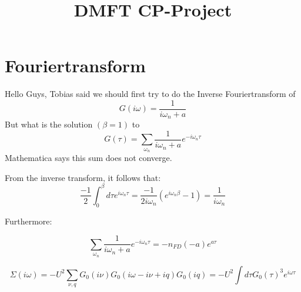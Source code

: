 \documentclass[a4paper]{article}
\title{DMFT CP-Project}
\begin{document}
\maketitle

\section{Fouriertransform}
Hello Guys, Tobias said we should first try to do the Inverse Fouriertransform of
\begin{equation}
G(i ω)= \frac{1}{i ω_n + a}
\end{equation}
But what is the solution $(β=1)$ to
\begin{equation}
G(τ)= \sum_{ω_n}\frac{1}{i ω_n + a} e^{-i ω_n τ}
\end{equation}
Mathematica says this sum does not converge. 


From the inverse transform, it follows that:
\begin{equation}
\frac{-1}{2} \int_0^{\beta} d\tau e^{i\omega_n \tau} = \frac{-1}{2i\omega_n} ( e^{i\omega_n \beta} - 1) = \frac{1}{i\omega_n}
\end{equation}

Furthermore:

\begin{equation}
\sum_{\omega_n} \frac{1}{i\omega_n + a} e^{-i\omega_n \tau} = - n_{FD} (-a) e^{a \tau} 
\end{equation}


\begin{equation}
\Sigma(i\omega) = - U^2 \sum_{\nu, q} G_0(i\nu) G_0(i\omega-i\nu+iq) G_0(iq) = -U^2 \int d\tau G_0(\tau)^3 e^{i\omega \tau} 
\end{equation}
\end{document}
